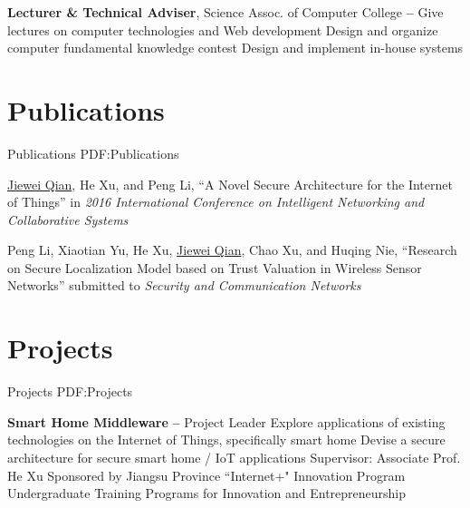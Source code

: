 \documentclass[a4paper,MMMyyyy,nonstop]{simpleresumecv}
\begin{document}
\begin{body}
\GapNoBreak

\textbf{Lecturer \& Technical Adviser}, Science Assoc. of Computer College
\hfill \textbf{
     -- 
}
\BulletItem
Give lectures on computer technologies and Web development
\BulletItem
Design and organize computer fundamental knowledge contest
\BulletItem
Design and implement in-house systems


\section
{Publications}
{Publications}
{PDF:Publications}

\BulletItem
\underline{Jiewei Qian}, He Xu, and Peng Li,
``A Novel Secure Architecture for the Internet of Things''
in \textit{2016 International Conference on Intelligent Networking and Collaborative Systems}

\GapNoBreak

\BulletItem
Peng Li, Xiaotian Yu, He Xu, \underline{Jiewei Qian}, Chao Xu, and Huqing Nie,
``Research on Secure Localization Model based on Trust Valuation in Wireless Sensor Networks''
submitted to \textit{Security and Communication Networks}


\section
{Projects}
{Projects}
{PDF:Projects}

\textbf{Smart Home Middleware}
\hfill \textbf{  --  }
\BulletItem
Project Leader
\BulletItem
Explore applications of existing technologies on the Internet of Things, specifically smart home
\BulletItem
Devise a secure architecture for secure smart home / IoT applications
\BulletItem
Supervisor: Associate Prof. He Xu
\BulletItem
Sponsored by Jiangsu Province ``Internet+" Innovation Program
\BulletItem
Undergraduate Training Programs for Innovation and Entrepreneurship



\end{body}
\end{document}
